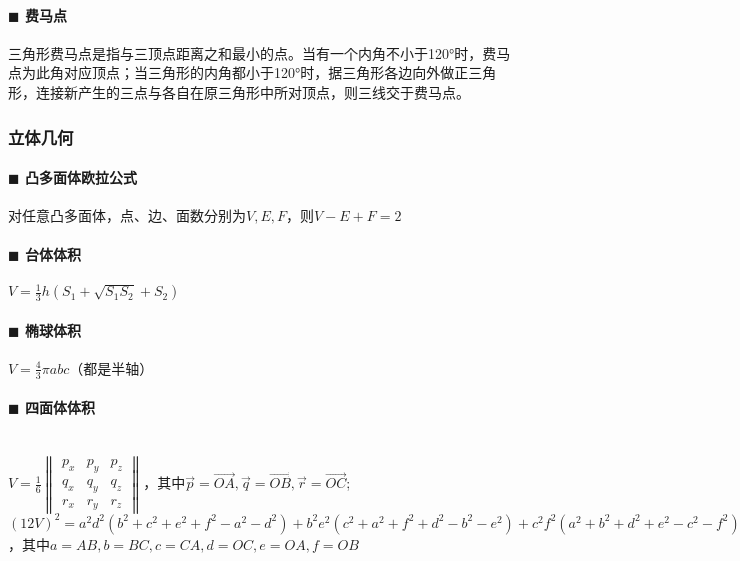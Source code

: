 \paragraph{$\blacksquare$ 费马点}
三角形费马点是指与三顶点距离之和最小的点。当有一个内角不小于120°时，费马点为此角对应顶点；当三角形的内角都小于120°时，据三角形各边向外做正三角形，连接新产生的三点与各自在原三角形中所对顶点，则三线交于费马点。

\subsubsection{立体几何}
\paragraph{$\blacksquare$ 凸多面体欧拉公式}
对任意凸多面体，点、边、面数分别为$V, E, F$，则$V-E+F=2$
\paragraph{$\blacksquare$ 台体体积}
$V=\frac{1}{3}h(S_1+\sqrt {S_1S_2}+S_2)$
\paragraph{$\blacksquare$ 椭球体积}
$V=\frac{4}{3} \pi abc$（都是半轴）
\paragraph{$\blacksquare$ 四面体体积}
\noindent \\
$V=\frac{1}{6} \begin{Vmatrix} p_x & p_y & p_z\\ q_x & q_y & q_z\\ r_x & r_y & r_z \end{Vmatrix}$，其中$\vec p=\overrightarrow{OA}, \vec q=\overrightarrow{OB}, \vec r=\overrightarrow{OC}$;\\
$(12V)^2=a^2d^2(b^2+c^2+e^2+f^2-a^2-d^2)+b^2e^2(c^2+a^2+f^2+d^2-b^2-e^2)+c^2f^2(a^2+b^2+d^2+e^2-c^2-f^2)-a^2b^2c^2-a^2e^2f^2-d^2b^2f^2-d^2e^2c^2$，其中$a=AB,b=BC,c=CA,d=OC,e=OA,f=OB$
